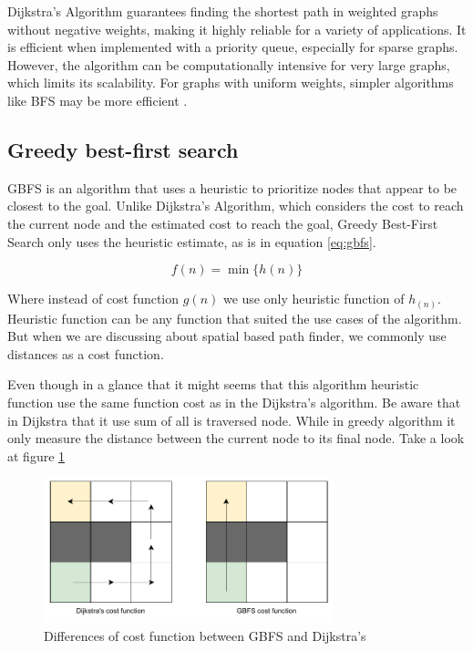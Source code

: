 \documentclass[12pt]{report}
\begin{document}
        Dijkstra's Algorithm guarantees finding the shortest path in weighted graphs without negative weights, making it
        highly reliable for a variety of applications. It is efficient when implemented with a priority queue,
        especially for sparse graphs. However, the algorithm can be computationally intensive for very large graphs,
        which limits its scalability. For graphs with uniform weights, simpler algorithms like BFS may be more efficient
        \cite{dijkstra_note_2022}.

        \subsection{Greedy best-first search}
        \ac{GBFS} is an algorithm that uses a heuristic to prioritize nodes that appear to be closest to
        the goal. Unlike Dijkstra's Algorithm, which considers the cost to reach the current node and the estimated cost
        to reach the goal, Greedy Best-First Search only uses the heuristic estimate, as is in equation \ref{eq:gbfs}.

        \begin{equation}\label{eq:gbfs}
            f(n) = \min_{} \{ h(n)\}
        \end{equation}

        Where instead of cost function \(g(n)\) we use only heuristic function of \(h_(n)\). Heuristic function can be
        any function that suited the use cases of the algorithm. But when we are discussing about spatial based path
        finder, we commonly use distances as a cost function. 

        Even though in a glance that it might seems that this algorithm heuristic function use the same function cost as
        in the Dijkstra's algorithm. Be aware that in Dijkstra that it use sum of all is traversed node. While in greedy
        algorithm it only measure the distance between the current node to its final node. Take a look at figure
        \ref{fig:greedybfs}

        \begin{figure}[H]
            \centering
            \includegraphics[width=0.75\textwidth]{General Image/OSM Drone-gbfs vs dijkstra.pdf}
            \caption{Differences of cost function between GBFS and Dijkstra's}
            \label{fig:greedybfs}
        \end{figure}
\end{document}
